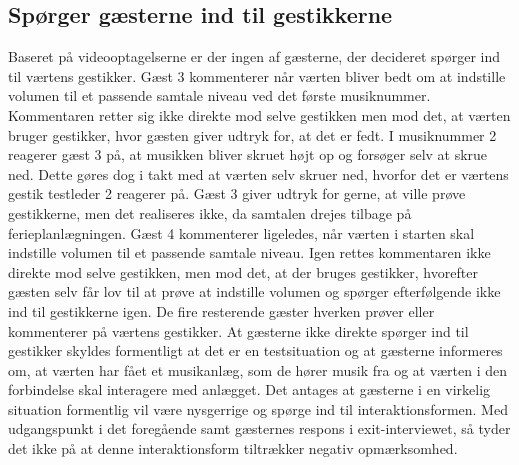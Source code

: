 \subsection{Spørger gæsterne ind til gestikkerne}
\label{TestresultaterSocialAcceptGaestSPGGestikker}
%
Baseret på videooptagelserne er der ingen af gæsterne, der decideret spørger ind til værtens gestikker. Gæst 3 kommenterer når værten bliver bedt om at indstille volumen til et passende samtale niveau ved det første musiknummer. Kommentaren retter sig ikke direkte mod selve gestikken men mod det, at værten bruger gestikker, hvor gæsten giver udtryk for, at det er fedt. I musiknummer 2 reagerer gæst 3 på, at musikken bliver skruet højt op og forsøger selv at skrue ned. Dette gøres dog i takt med at værten selv skruer ned, hvorfor det er værtens gestik testleder 2 reagerer på. Gæst 3 giver udtryk for gerne, at ville prøve gestikkerne, men det realiseres ikke, da samtalen drejes tilbage på ferieplanlægningen. Gæst 4 kommenterer ligeledes, når værten i starten skal indstille volumen til et passende samtale niveau. Igen rettes kommentaren ikke direkte mod selve gestikken, men mod det, at der bruges gestikker, hvorefter gæsten selv får lov til at prøve at indstille volumen og spørger efterfølgende ikke ind til gestikkerne igen. De fire resterende gæster hverken prøver eller kommenterer på værtens gestikker. At gæsterne ikke direkte spørger ind til gestikker skyldes formentligt at det er en testsituation og at gæsterne informeres om, at værten har fået et musikanlæg, som de hører musik fra og at værten i den forbindelse skal interagere med anlægget. Det antages at gæsterne i en virkelig situation formentlig vil være nysgerrige og spørge ind til interaktionsformen. Med udgangspunkt i det foregående samt gæsternes respons i exit-interviewet, så tyder det ikke på at denne interaktionsform tiltrækker negativ opmærksomhed. 
%
